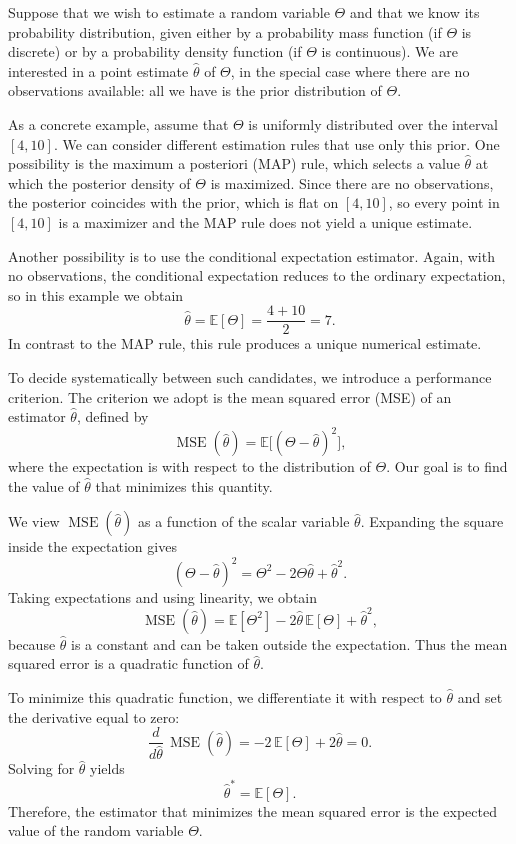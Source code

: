 Suppose that we wish to estimate a random variable \(\Theta\) and that we know its probability distribution, given either by a probability mass function (if \(\Theta\) is discrete) or by a probability density function (if \(\Theta\) is continuous).  
We are interested in a point estimate \(\hat{\theta}\) of \(\Theta\), in the special case where there are no observations available: all we have is the prior distribution of \(\Theta\).

As a concrete example, assume that \(\Theta\) is uniformly distributed over the interval \([4,10]\).  
We can consider different estimation rules that use only this prior.  
One possibility is the maximum a posteriori (MAP) rule, which selects a value \(\hat{\theta}\) at which the posterior density of \(\Theta\) is maximized.  
Since there are no observations, the posterior coincides with the prior, which is flat on \([4,10]\), so every point in \([4,10]\) is a maximizer and the MAP rule does not yield a unique estimate.

Another possibility is to use the conditional expectation estimator.  
Again, with no observations, the conditional expectation reduces to the ordinary expectation, so in this example we obtain
\[
\hat{\theta}
=
\mathbb{E}[\Theta]
=
\frac{4 + 10}{2}
=
7.
\]
In contrast to the MAP rule, this rule produces a unique numerical estimate.

To decide systematically between such candidates, we introduce a performance criterion.  
The criterion we adopt is the mean squared error (MSE) of an estimator \(\hat{\theta}\), defined by
\[
\operatorname{MSE}(\hat{\theta})
=
\mathbb{E}\big[(\Theta - \hat{\theta})^{2}\big],
\]
where the expectation is with respect to the distribution of \(\Theta\).  
Our goal is to find the value of \(\hat{\theta}\) that minimizes this quantity.

We view \(\operatorname{MSE}(\hat{\theta})\) as a function of the scalar variable \(\hat{\theta}\).  
Expanding the square inside the expectation gives
\[
(\Theta - \hat{\theta})^{2}
=
\Theta^{2}
-
2\Theta\hat{\theta}
+
\hat{\theta}^{2}.
\]
Taking expectations and using linearity, we obtain
\[
\operatorname{MSE}(\hat{\theta})
=
\mathbb{E}[\Theta^{2}]
-
2\hat{\theta}\,\mathbb{E}[\Theta]
+
\hat{\theta}^{2},
\]
because \(\hat{\theta}\) is a constant and can be taken outside the expectation.  
Thus the mean squared error is a quadratic function of \(\hat{\theta}\).

To minimize this quadratic function, we differentiate it with respect to \(\hat{\theta}\) and set the derivative equal to zero:
\[
\frac{d}{d\hat{\theta}}\,\operatorname{MSE}(\hat{\theta})
=
-2\,\mathbb{E}[\Theta]
+
2\hat{\theta}
=
0.
\]
Solving for \(\hat{\theta}\) yields
\[
\hat{\theta}^{\ast}
=
\mathbb{E}[\Theta].
\]
Therefore, the estimator that minimizes the mean squared error is the expected value of the random variable \(\Theta\).

